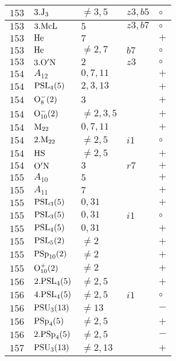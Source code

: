\documentclass[a4paper, 11pt]{article}
\begin{document}
\begin{longtable}{lllll}
		$153$ & $3.{\rm J}_3$ & $\neq 3,5$ & $z3, b5$ & $\circ$ \\ \hline
		$153$ & $3.{\rm McL}$ & $5$ & $z3, b7$ & $\circ$ \\ \hline
		$153$ & ${\rm He}$ & $7$ &  & $+$ \\ \hline
		$153$ & ${\rm He}$ & $\neq 2,7$ & $b7$ & $\circ$ \\ \hline
		$153$ & $3.{\rm {\rm O'N}}$ & $2$ & $z3$ & $\circ$ \\ \hline
		$154$ & $A_{12}$ & $0,7,11$ &  & $+$ \\ \hline
		$154$ & ${\rm PSL}_{4}(5)$ & $2, 3, 13$ &  & $+$ \\ \hline
		$154$ & ${\rm O}_{8}^-(2)$ & $3$ &  & $+$ \\ \hline
		$154$ & ${\rm O}_{10}^-(2)$ & $\neq 2,3,5$ &  & $+$ \\ \hline
		$154$ & ${\rm M}_{22}$ & $0,7,11$ &  & $+$ \\ \hline
		$154$ & $2.{\rm M}_{22}$ & $\neq 2,5$ & $i1$ & $\circ$ \\ \hline
		$154$ & ${\rm HS}$ & $\neq 2,5$ &  & $+$ \\ \hline
		$154$ & ${\rm O'N}$ & $3$ & $r7$ & $+$ \\ \hline
		$155$ & $A_{10}$ & $5$ &  & $+$ \\ \hline
		$155$ & $A_{11}$ & $7$ &  & $+$ \\ \hline
		$155$ & ${\rm PSL}_{3}(5)$ & $0,31$ &  & $+$ \\ \hline
		$155$ & ${\rm PSL}_{3}(5)$ & $0,31$ & $i1$ & $\circ$ \\ \hline
		$155$ & ${\rm PSL}_{4}(5)$ & $0,31$ &  & $+$ \\ \hline
		$155$ & ${\rm PSL}_{5}(2)$ & $\neq 2$ &  & $+$ \\ \hline
		$155$ & ${\rm PSp}_{10}(2)$ & $\neq 2$ &  & $+$ \\ \hline
		$155$ & ${\rm O}_{10}^+(2)$ & $\neq 2$ &  & $+$ \\ \hline
		$156$ & $2.{\rm PSL}_{4}(5)$ & $\neq 2,5$ &  & $+$ \\ \hline
		$156$ & $4.{\rm PSL}_{4}(5)$ & $\neq 2,5$ & $i1$ & $\circ$ \\ \hline
		$156$ & ${\rm PSU}_{3}(13)$ & $\neq 13$ &  & $-$ \\ \hline
		$156$ & ${\rm PSp}_{4}(5)$ & $\neq 2,5$ &  & $+$ \\ \hline
		$156$ & $2.{\rm PSp}_{4}(5)$ & $\neq 2,5$ &  & $-$ \\ \hline
		$157$ & ${\rm PSU}_{3}(13)$ & $\neq 2,13$ &  & $+$ \\ \hline

\end{longtable}
\end{document}
